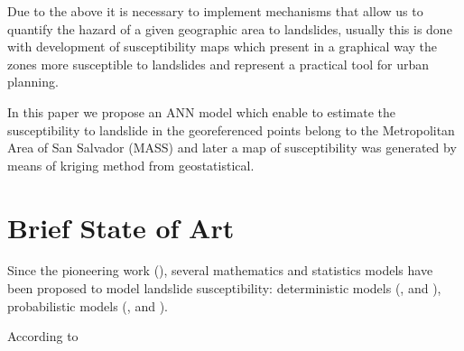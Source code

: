 \documentclass[11pt,twoside]{rmta2010esp}%
\begin{document}
Due to the above it is necessary to implement mechanisms that allow us to quantify the hazard of a given
geographic area to landslides, usually this is done with development of susceptibility maps which present in a graphical way
the zones more susceptible to landslides and represent a practical tool for urban planning.


%
%
%
In this paper we propose an ANN model which enable to estimate the susceptibility to landslide in the georeferenced points belong to the Metropolitan Area of San Salvador (MASS) and later a map of susceptibility was generated by means of kriging method from geostatistical. 







\section{Brief State of Art}
\label{sec:brief}
Since the pioneering work (\cite{Carrara1983403}), several mathematics and statistics models have been proposed to model landslide susceptibility: deterministic models (\cite{hessd-10-12643-2013},  \cite{doi:10.1080/19475705.2010.498151} and \cite{Neu2012511}), probabilistic models (\cite{Bern198839}, \cite{Chung2003451} and \cite{doi:10.1080/01431160310001618734} ). 

According to 
\end{document}
